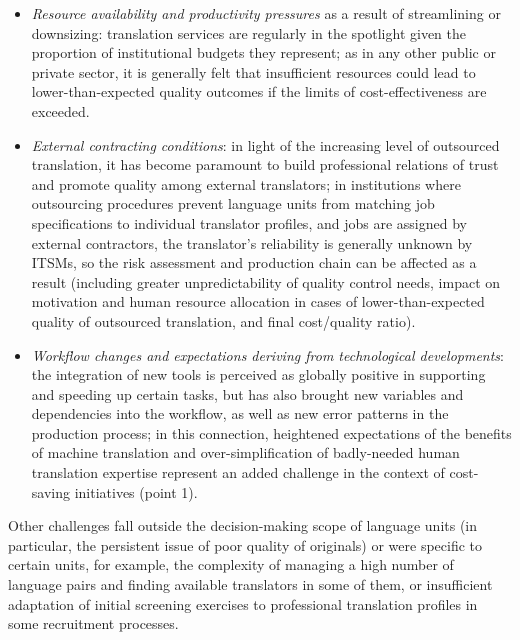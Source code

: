 \documentclass[output=paper]{langsci/langscibook}
\begin{document}
\begin{itemize}
\item 
\textit{Resource availability and productivity pressures} as a result of streamlining or downsizing: translation services are regularly in the spotlight given the proportion of institutional budgets they represent; as in any other public or private sector, it is generally felt that insufficient resources could lead to lower-than-expected quality outcomes if the limits of cost-effectiveness are exceeded. 
\end{itemize}
\begin{itemize}
\item 
\textit{External contracting conditions}: in light of the increasing level of outsourced translation, it has become paramount to build professional relations of trust and promote quality among external translators; in institutions where outsourcing procedures prevent language units from matching job specifications to individual translator profiles, and jobs are assigned by external contractors, the translator’s reliability is generally unknown by ITSMs, so the risk assessment and production chain can be affected as a result (including greater unpredictability of quality control needs, impact on motivation and human resource allocation in cases of lower-than-expected quality of outsourced translation, and final cost/quality ratio). 
\end{itemize}
\begin{itemize}
\item 
\textit{Workflow changes and expectations deriving from technological developments}: the integration of new tools is perceived as globally positive in supporting and speeding up certain tasks, but has also brought new variables and dependencies into the workflow, as well as new error patterns in the production process; in this connection, heightened expectations of the benefits of machine translation and over-simplification of badly-needed human translation expertise represent an added challenge in the context of cost-saving initiatives (point 1). 
\end{itemize}

Other challenges fall outside the decision-making scope of language units (in particular, the persistent issue of poor quality of originals) or were specific to certain units, for example, the complexity of managing a high number of language pairs and finding available translators in some of them, or insufficient adaptation of initial screening exercises to professional translation profiles in some recruitment processes. 
\end{document}
